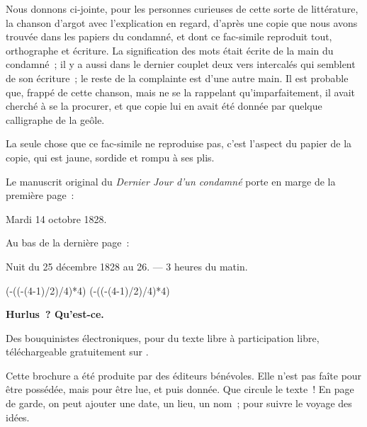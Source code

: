 \documentclass[french,twoside]{book} %
\def\mednobreak{\ifdim\lastskip<\medskipamount
  \removelastskip\nopagebreak\medskip\fi}
\newcommand{\labelblock}[1]{\medbreak{\noindent\color{rubric}\bfseries #1}\par\mednobreak}
\def\truncdiv#1#2{((#1-(#2-1)/2)/#2)}
\def\moduloop#1#2{(#1-\truncdiv{#1}{#2}*#2)}
\def\modulo#1#2{\number\numexpr\moduloop{#1}{#2}\relax}
\begin{document}
\labelblock{1829}

\noindent Nous donnons ci-jointe, pour les personnes curieuses de cette sorte de littérature, la chanson d’argot avec l’explication en regard, d’après une copie que nous avons trouvée dans les papiers du condamné, et dont ce fac-simile reproduit tout, orthographe et écriture. La signification des mots était écrite de la main du condamné ; il y a aussi dans le dernier couplet deux vers intercalés qui semblent de son écriture ; le reste de la complainte est d’une autre main. Il est probable que, frappé de cette chanson, mais ne se la rappelant qu’imparfaitement, il avait cherché à se la procurer, et que copie lui en avait été donnée par quelque calligraphe de la geôle.\par
La seule chose que ce fac-simile ne reproduise pas, c’est l’aspect du papier de la copie, qui est jaune, sordide et rompu à ses plis.\par
 
\labelblock{1881}

\noindent Le manuscrit original du \emph{Dernier Jour d’un condamné} porte en marge de la première page :\par
\bigbreak
\noindent Mardi 14 octobre 1828.\par
\bigbreak
\noindent Au bas de la dernière page :\par
\bigbreak
\noindent Nuit du 25 décembre 1828 au 26. — 3 heures du matin.
 


\ifbooklet
  \pagestyle{empty}
  \clearpage
  \ifnum\modulo{\value{page}}{4}=0 \hbox{}\newpage\hbox{}\newpage\fi
  \ifnum\modulo{\value{page}}{4}=1 \hbox{}\newpage\hbox{}\newpage\fi


  \hbox{}\newpage
  \ifodd\value{page}\hbox{}\newpage\fi
  {\centering\color{rubric}\bfseries\noindent\large
    Hurlus ? Qu’est-ce.\par
    \bigskip
  }
  \noindent Des bouquinistes électroniques, pour du texte libre à participation libre,
  téléchargeable gratuitement sur \href{https://hurlus.fr}{}.\par
  \bigskip
  \noindent Cette brochure a été produite par des éditeurs bénévoles.
  Elle n’est pas faîte pour être possédée, mais pour être lue, et puis donnée.
  Que circule le texte !
  En page de garde, on peut ajouter une date, un lieu, un nom ; pour suivre le voyage des idées.
  \par
\end{document}

